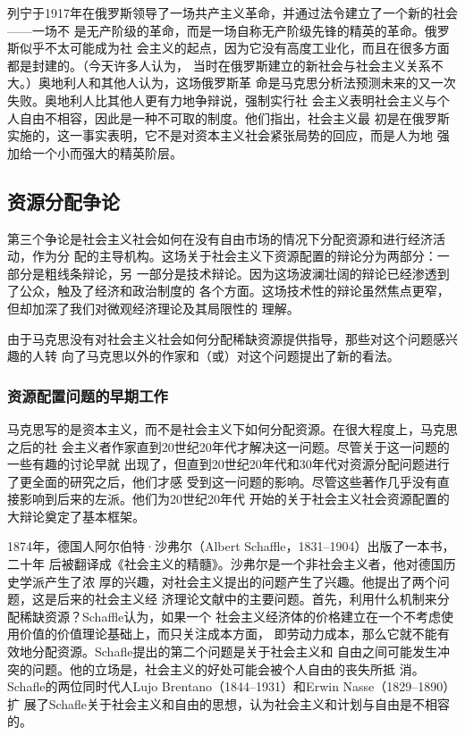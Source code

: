 列宁于1917年在俄罗斯领导了一场共产主义革命，并通过法令建立了一个新的社会——一场不
是无产阶级的革命，而是一场自称无产阶级先锋的精英的革命。俄罗斯似乎不太可能成为社
会主义的起点，因为它没有高度工业化，而且在很多方面都是封建的。（今天许多人认为，
当时在俄罗斯建立的新社会与社会主义关系不大。）奥地利人和其他人认为，这场俄罗斯革
命是马克思分析法预测未来的又一次失败。奥地利人比其他人更有力地争辩说，强制实行社
会主义表明社会主义与个人自由不相容，因此是一种不可取的制度。他们指出，社会主义最
初是在俄罗斯实施的，这一事实表明，它不是对资本主义社会紧张局势的回应，而是人为地
强加给一个小而强大的精英阶层。

\subsection{资源分配争论}

第三个争论是社会主义社会如何在没有自由市场的情况下分配资源和进行经济活动，作为分
配的主导机构。这场关于社会主义下资源配置的辩论分为两部分：一部分是粗线条辩论，另
一部分是技术辩论。因为这场波澜壮阔的辩论已经渗透到了公众，触及了经济和政治制度的
各个方面。这场技术性的辩论虽然焦点更窄，但却加深了我们对微观经济理论及其局限性的
理解。

由于马克思没有对社会主义社会如何分配稀缺资源提供指导，那些对这个问题感兴趣的人转
向了马克思以外的作家和（或）对这个问题提出了新的看法。

\subsubsection{资源配置问题的早期工作}

马克思写的是资本主义，而不是社会主义下如何分配资源。在很大程度上，马克思之后的社
会主义者作家直到20世纪20年代才解决这一问题。尽管关于这一问题的一些有趣的讨论早就
出现了，但直到20世纪20年代和30年代对资源分配问题进行了更全面的研究之后，他们才感
受到这一问题的影响。尽管这些著作几乎没有直接影响到后来的左派。他们为20世纪20年代
开始的关于社会主义社会资源配置的大辩论奠定了基本框架。

1874年，德国人阿尔伯特·沙弗尔（Albert Schaffle，1831--1904）出版了一本书，二十年
后被翻译成《社会主义的精髓》。沙弗尔是一个非社会主义者，他对德国历史学派产生了浓
厚的兴趣，对社会主义提出的问题产生了兴趣。他提出了两个问题，这是后来的社会主义经
济理论文献中的主要问题。首先，利用什么机制来分配稀缺资源？Schaffle认为，如果一个
社会主义经济体的价格建立在一个不考虑使用价值的价值理论基础上，而只关注成本方面，
即劳动力成本，那么它就不能有效地分配资源。Schafle提出的第二个问题是关于社会主义和
自由之间可能发生冲突的问题。他的立场是，社会主义的好处可能会被个人自由的丧失所抵
消。Schafle的两位同时代人Lujo Brentano（1844--1931）和Erwin Nasse（1829--1890）扩
展了Schafle关于社会主义和自由的思想，认为社会主义和计划与自由是不相容的。



